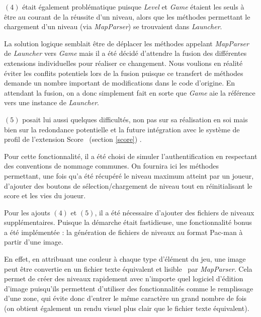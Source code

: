 \documentclass[12pt, openany]{report}
\begin{document}
$(4)$ était également problématique puisque \mbox{\textit{Level}} et \mbox{\textit{Game}} étaient les seuls à être au courant de la réussite d'un niveau, alors que les méthodes permettant le chargement d'un niveau (via \mbox{\textit{MapParser}}) se trouvaient dans \mbox{\textit{Launcher}}. 

La solution logique semblait être de déplacer les méthodes appelant \mbox{\textit{MapParser}} de \mbox{\textit{Launcher}} vers \mbox{\textit{Game}} mais il a été décidé d'attendre la fusion des différentes extensions individuelles pour réaliser ce changement. Nous voulions en réalité éviter les conflits potentiels lors de la fusion puisque ce \og transfert \fg de méthodes demande un nombre important de modifications dans le code d'origine. En attendant la fusion, on a donc simplement fait en sorte que \mbox{\textit{Game}} aie la référence vers une instance de \mbox{\textit{Launcher}}.

$(5)$ posait lui aussi quelques difficultés, non pas sur sa réalisation en soi mais bien sur la redondance potentielle et la future intégration avec le système de profil de l'extension \og Score \fg \, (section \ref{score}) . 

Pour cette fonctionnalité, il a été choisi de simuler l'authentification en respectant des conventions de nommage communes. On fournira ici les méthodes permettant, une fois qu'a été récupéré le niveau maximum atteint par un joueur, d'ajouter des boutons de sélection/chargement de niveau tout en réinitialisant le score et les vies du joueur.

Pour les ajouts $(4)$ et $(5)$, il a été nécessaire d'ajouter des fichiers de niveaux supplémentaires. Puisque la démarche était fastidieuse, une fonctionnalité \og bonus \fg \, a été implémentée : la génération de fichiers de niveaux au format Pac-man à partir d'une image. \label{map_generator_txt}

En effet, en attribuant une couleur à chaque type d'élément du jeu,  une image peut être convertie en un fichier texte équivalent et \og lisible \fg \, par \mbox{\textit{MapParser}}. Cela permet de créer des niveaux rapidement avec n'importe quel logiciel d'édition d'image puisqu'ils permettent d'utiliser des fonctionnalités comme le \og remplissage \fg d'une zone, qui évite donc d'entrer le même caractère un grand nombre de fois (on obtient également un rendu visuel plus clair que le fichier texte équivalent). 
\end{document}
